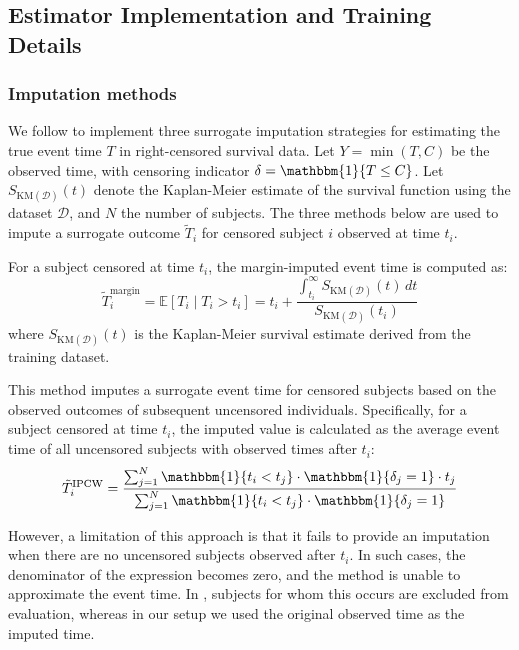 
\subsection{Estimator Implementation and Training Details}\label{ch04:app:implementation}

\ChFourHeadingOnly
\subsubsection{Imputation methods}\label{ch04:app:imputation}

We follow \citet{qi2023an} to implement three surrogate imputation strategies for estimating the true event time \( T \) in right-censored survival data.
Let \( Y = \min(T, C) \) be the observed time, with censoring indicator \( \delta = \mathbbm{1}\{T \leq C\} \).
Let \( S_{\text{KM}(\mathcal{D})}(t) \) denote the Kaplan-Meier estimate of the survival function using the dataset \( \mathcal{D} \), and \( N \) the number of subjects.
The three methods below are used to impute a surrogate outcome \( \tilde{T}_i \) for censored subject \( i \) observed at time \( t_i \).

For a subject censored at time \( t_i \), the margin-imputed event time is computed as:
\begin{equation}
\tilde{T}^{\text{margin}}_i 
= \mathbb{E}[T_i \mid T_i > t_i] 
= t_i + \frac{\int_{t_i}^{\infty} S_{\text{KM}(\mathcal{D})}(t) \, dt}{S_{\text{KM}(\mathcal{D})}(t_i)}
\end{equation}
where \( S_{\text{KM}(\mathcal{D})}(t) \) is the Kaplan-Meier survival estimate derived from the training dataset.

This method imputes a surrogate event time for censored subjects based on the observed outcomes of subsequent uncensored individuals.
Specifically, for a subject censored at time \( t_i \), the imputed value is calculated as the average event time of all uncensored subjects with observed times after \( t_i \):
\begin{equation}
\tilde{T}^{\text{IPCW}}_i = 
\frac{\sum_{j=1}^N \mathbbm{1}\{t_i < t_j\} \cdot \mathbbm{1}\{\delta_j = 1\} \cdot t_j}
     {\sum_{j=1}^N \mathbbm{1}\{t_i < t_j\} \cdot \mathbbm{1}\{\delta_j = 1\}}
\end{equation}

However, a limitation of this approach is that it fails to provide an imputation when there are no uncensored subjects observed after \( t_i \).
In such cases, the denominator of the expression becomes zero, and the method is unable to approximate the event time.
In \citet{qi2023an}, subjects for whom this occurs are excluded from evaluation, whereas in our setup we used the original observed time as the imputed time.

